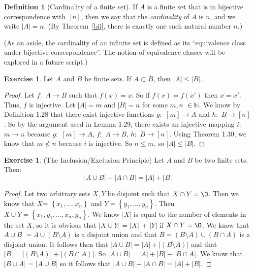 \documentclass[12pt]{article}
\renewcommand{\emptyset}{\O}
\providecommand{\abs}[1]{\lvert #1 \rvert}
\theoremstyle{definition}
\newtheorem*{definition*}{Definition}
\newtheorem{exercise}[theorem]{Exercise}
\numberwithin{equation}{subsection}
\begin{document}
{\begin{definition*}[Cardinality of a finite set]
 If $A$ is a finite set that is in bijective correspondence with $[n]$, then we say that the \emph{cardinality} of $A$ is $n$, and we write $\abs{A} = n$.  (By Theorem~\ref{bij}, there is exactly one such natural number $n$.) 
\end{definition*}

(As an aside, the cardinality of an infinite set is defined as its ``equivalence class under bijective correspondence''. The notion of equivalence classes will be explored in a future script.)

\begin{exercise}
Let $A$ and $B$ be finite sets. 
If $A\subset B$, then $|A|\leq |B|$.
\end{exercise}
\begin{proof}
Let $f: $ $A \to B$ such that $f(x) = x$. So if $f(x) = f(x')$ then $x=x'$. Thus, $f$ is injective. Let $|A| = m$ and $|B| = n$ for some $m,n$ $\in \mathbb N$. We know by Definition 1.28 that there exist injective functions $g: $ $[m] \to A$ and $h: $ $B \to [n]$. So by the argument used in Lemma 1.29, there exists an injective mapping $i: $ $m \to n$ because $g: $ $[m] \to A$, $f: $ $A \to B$, $h: $ $B \to [n]$. Using Theorem 1.30, we know that $m \not < n$ because $i$ is injective. So $n \leq m$, so $|A| \leq |B|$.
\end{proof}
\begin{exercise}
(The Inclusion/Exclusion Principle)
Let $A$ and $B$ be two finite sets.  Then:
$$|A\cup B|+|A\cap B|=|A|+|B|$$
\end{exercise}
\begin{proof}
Let two arbitrary sets $X,Y$ be disjoint such that $X \cap Y = \emptyset$. Then we know that $X $= $\left\{x_1,...,x_n\right\}$ and $Y = \left\{y_1,...,y_n\right\}$. Then $X \cup Y = \left\{x_1,y_1,...,x_n,y_n\right\}$. We know $|X|$ is equal to the number of elements in the set $X$, so it is obvious that $|X \cup Y|$ = $|X|$ + $|Y|$ if $X \cap Y = \emptyset$.
We know that $A \cup B$ $= A \cup (B \setminus A)$ is a disjoint union and that $B = (B \setminus A) \cup (B \cap A)$ is a disjoint union. It follows then that $|A \cup B| = |A| + |(B \setminus A)|$ and that $|B| = |(B \setminus A)| + |(B \cap A)|$. So $|A \cup B| = |A| + |B| - |B \cap A|$. We know that $|B \cup A|$ = $|A \cup B|$ so it follows that $|A \cup B| + |A \cap B| = |A| + |B|$.
\end{proof}

}
\end{document}
